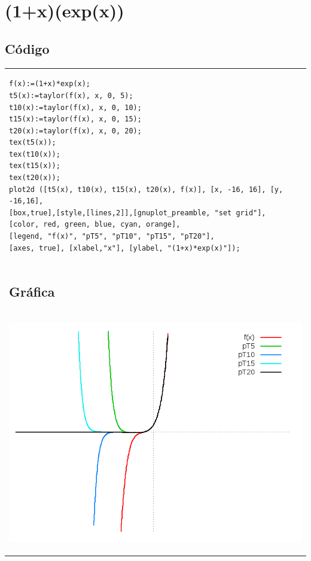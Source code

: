 \documentclass[10pt]{article}
\begin{document}
\section{(1+x)(exp(x))}


\subsection{Código}
\begin{tabular}{l}
\begin{verbatim}  
f(x):=(1+x)*exp(x);
t5(x):=taylor(f(x), x, 0, 5);
t10(x):=taylor(f(x), x, 0, 10);
t15(x):=taylor(f(x), x, 0, 15);
t20(x):=taylor(f(x), x, 0, 20);
tex(t5(x));
tex(t10(x));
tex(t15(x));
tex(t20(x));
plot2d ([t5(x), t10(x), t15(x), t20(x), f(x)], [x, -16, 16], [y, -16,16],
[box,true],[style,[lines,2]],[gnuplot_preamble, "set grid"],
[color, red, green, blue, cyan, orange],
[legend, "f(x)", "pT5", "pT10", "pT15", "pT20"],
[axes, true], [xlabel,"x"], [ylabel, "(1+x)*exp(x)"]);
\end{verbatim} \\
\subsection{Gráfica}\\
\begin{center}
  
    \includegraphics[scale=0.4]{1xexp}
\end{center}
\end{tabular}


\end{document}
